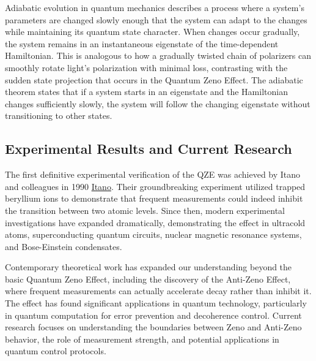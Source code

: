\documentclass[
  a4paper,
]{book}
\begin{document}
\begin{tcolorbox}[enhanced jigsaw, coltitle=black, title=\textcolor{quarto-callout-note-color}{\faInfo}\hspace{0.5em}{Adiabatic Evolution}, colframe=quarto-callout-note-color-frame, toprule=.15mm, opacitybacktitle=0.6, left=2mm, opacityback=0, breakable, toptitle=1mm, bottomtitle=1mm, leftrule=.75mm, arc=.35mm, titlerule=0mm, colbacktitle=quarto-callout-note-color!10!white, rightrule=.15mm, bottomrule=.15mm, colback=white]

Adiabatic evolution in quantum mechanics describes a process where a
system's parameters are changed slowly enough that the system can adapt
to the changes while maintaining its quantum state character. When
changes occur gradually, the system remains in an instantaneous
eigenstate of the time-dependent Hamiltonian. This is analogous to how a
gradually twisted chain of polarizers can smoothly rotate light's
polarization with minimal loss, contrasting with the sudden state
projection that occurs in the Quantum Zeno Effect. The adiabatic theorem
states that if a system starts in an eigenstate and the Hamiltonian
changes sufficiently slowly, the system will follow the changing
eigenstate without transitioning to other states.

\end{tcolorbox}

\subsection{Experimental Results and Current
Research}\label{experimental-results-and-current-research}

The first definitive experimental verification of the QZE was achieved
by Itano and colleagues in 1990
\href{https://journals.aps.org/pra/abstract/10.1103/PhysRevA.41.2295}{Itano}.
Their groundbreaking experiment utilized trapped beryllium ions to
demonstrate that frequent measurements could indeed inhibit the
transition between two atomic levels. Since then, modern experimental
investigations have expanded dramatically, demonstrating the effect in
ultracold atoms, superconducting quantum circuits, nuclear magnetic
resonance systems, and Bose-Einstein condensates.

Contemporary theoretical work has expanded our understanding beyond the
basic Quantum Zeno Effect, including the discovery of the Anti-Zeno
Effect, where frequent measurements can actually accelerate decay rather
than inhibit it. The effect has found significant applications in
quantum technology, particularly in quantum computation for error
prevention and decoherence control. Current research focuses on
understanding the boundaries between Zeno and Anti-Zeno behavior, the
role of measurement strength, and potential applications in quantum
control protocols.
\end{document}
